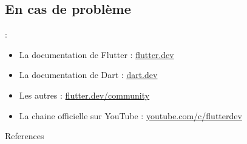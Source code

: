 \documentclass[10pt]{beamer}
\begin{document}
\subsection{En cas de problème}
\begin{frame}[fragile,t]{\secname : \subsecname}
    \begin{itemize}
        \item La documentation de Flutter : \href{flutter.dev}{flutter.dev}
        \item La documentation de Dart : \href{dart.dev}{dart.dev}
        \item Les autres : \href{https://flutter.dev/community}{flutter.dev/community}
        \item La chaine officielle sur YouTube : \href{https://www.youtube.com/c/flutterdev/}{youtube.com/c/flutterdev}
    \end{itemize}
\end{frame}


\begin{frame}[allowframebreaks]{References}
    
    
\end{frame}
\end{document}
